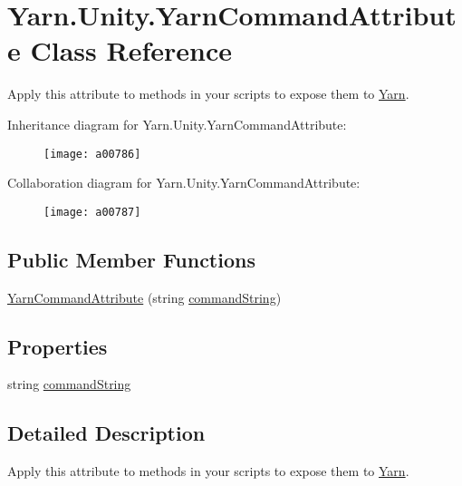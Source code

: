 \hypertarget{a00195}{\section{Yarn.\-Unity.\-Yarn\-Command\-Attribute Class Reference}
\label{a00195}
}


Apply this attribute to methods in your scripts to expose them to \hyperlink{a00053}{Yarn}.  




Inheritance diagram for Yarn.\-Unity.\-Yarn\-Command\-Attribute\-:
\nopagebreak
\begin{figure}[H]
\begin{center}
\leavevmode
\texttt{[image: a00786]}
\end{center}
\end{figure}


Collaboration diagram for Yarn.\-Unity.\-Yarn\-Command\-Attribute\-:
\nopagebreak
\begin{figure}[H]
\begin{center}
\leavevmode
\texttt{[image: a00787]}
\end{center}
\end{figure}
\subsection*{Public Member Functions}
\begin{DoxyCompactItemize}
\item 
\hyperlink{a00195_a9c0d57cd72c091f63895944959e98330}{Yarn\-Command\-Attribute} (string \hyperlink{a00195_a6d513a725c819ffcdaa9c5788472ec8d}{command\-String})
\end{DoxyCompactItemize}
\subsection*{Properties}
\begin{DoxyCompactItemize}
\item 
string \hyperlink{a00195_a6d513a725c819ffcdaa9c5788472ec8d}{command\-String}
\end{DoxyCompactItemize}


\subsection{Detailed Description}
Apply this attribute to methods in your scripts to expose them to \hyperlink{a00053}{Yarn}. 

